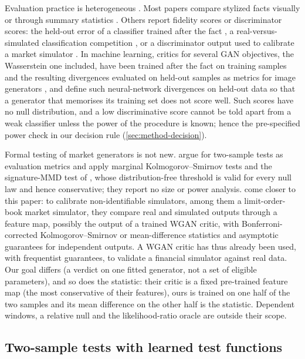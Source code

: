 Evaluation practice is heterogeneous \citep{stenger2024evaluation}. Most papers compare stylized
facts \citep{cont2001empirical} visually or through summary statistics
\citep{wiese2020quant,takahashi2019modeling,vyetrenko2020get}. Others report fidelity scores
\citep{alaa2022faithful} or discriminator scores: the held-out error of a classifier trained after
the fact \citep{yoon2019time}, a real-versus-simulated classification competition
\citep{francopedroso2018ets}, or a discriminator output used to calibrate a market simulator
\citep{storchan2021learning}. In machine learning, critics for several GAN objectives, the
Wasserstein one included, have been trained after the fact on training samples and the resulting
divergences evaluated on held-out samples as metrics for image generators
\citep{im_2018_quantitatively}, and \citet{gulrajani_2019_towards} define such neural-network
divergences on held-out data so that a generator that memorises its training set does not score
well. Such scores have no null distribution, and a low discriminative score
cannot be told apart from a weak classifier unless the power of the procedure is known; hence the
pre-specified power check in our decision rule (\cref{sec:method-decision}).

Formal testing of market generators is not new.  argue for two-sample tests
as evaluation metrics and apply marginal Kolmogorov--Smirnov tests and the signature-MMD test of
\citet{chevyrev2022signature}, whose distribution-free threshold is valid for every null law and
hence conservative; they report no size or power analysis.  come closer
to this paper: to calibrate non-identifiable simulators, among them a limit-order-book market
simulator, they compare real and simulated outputs through a feature map, possibly the output of a
trained WGAN critic, with Bonferroni-corrected Kolmogorov--Smirnov or mean-difference statistics
and asymptotic guarantees for independent outputs. A WGAN critic has thus already been used, with
frequentist guarantees, to validate a financial simulator against real data. Our goal differs (a
verdict on one fitted generator, not a set of eligible parameters), and so does the statistic:
their critic is a fixed pre-trained feature map (the most conservative of their features), ours is
trained on one half of the two samples and its mean difference on the other half is the statistic.
Dependent windows, a relative null and the likelihood-ratio oracle are outside their scope.

\subsection{Two-sample tests with learned test functions}\label{sec:lit-tests}

